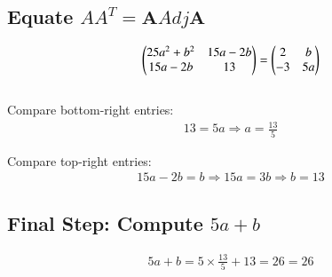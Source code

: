 \documentclass{article}
\begin{document}
\subsection*{Equate $AA^T = \textbf{A}Adj\textbf{A}$}

\begin{align}
\begin{pmatrix}
25a^2 + b^2 & 15a - 2b \\
15a - 2b & 13
\end{pmatrix}
=
\begin{pmatrix}
2 & b \\
-3 & 5a
\end{pmatrix}
\end{align}\\

Compare bottom-right entries:
\begin{align}
13 = 5a \Rightarrow a = \frac{13}{5}
\end{align}

Compare top-right entries:
\begin{align}
15a - 2b = b \Rightarrow 15a = 3b \Rightarrow b = 13
\end{align}


\subsection*{Final Step: Compute $5a + b$}

\begin{align}
5a + b = 5 \times \frac{13}{5} + 13 = 26 = \boxed{26}
\end{align}
\end{document}
